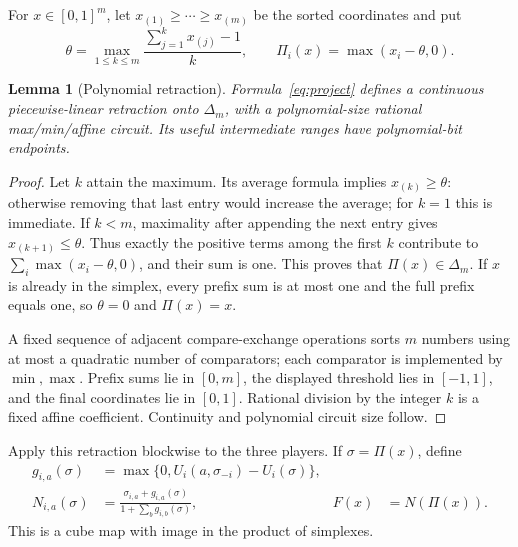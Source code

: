 \documentclass[11pt,a4paper]{article}
\numberwithin{equation}{section}
\newtheorem{lemma}[theorem]{Lemma}
\theoremstyle{definition}
\begin{document}
For \(x\in[0,1]^m\), let \(x_{(1)}\geq\cdots\geq x_{(m)}\)
be the sorted coordinates and put
\begin{equation}\label{eq:project}
 \theta=\max_{1\leq k\leq m}
           \frac{\sum_{j=1}^k x_{(j)}-1}{k},
 \qquad \Pi_i(x)=\max(x_i-\theta,0).
\end{equation}

\begin{lemma}[Polynomial retraction]\label{lem:projection}
Formula~\eqref{eq:project} defines a continuous piecewise-linear
retraction onto \(\Delta_m\), with a polynomial-size rational
max/min/affine circuit. Its useful intermediate ranges have
polynomial-bit endpoints.
\end{lemma}
\begin{proof}
Let \(k\) attain the maximum. Its average formula implies
\(x_{(k)}\geq\theta\): otherwise removing that last entry would
increase the average; for \(k=1\) this is immediate.
If \(k<m\), maximality after appending the next entry gives
\(x_{(k+1)}\leq\theta\). Thus exactly the positive terms among the
first \(k\) contribute to \(\sum_i\max(x_i-\theta,0)\), and their
sum is one. This proves that \(\Pi(x)\in\Delta_m\).
If \(x\) is already in the simplex, every prefix sum is at most one
and the full prefix equals one, so \(\theta=0\) and \(\Pi(x)=x\).

A fixed sequence of adjacent compare-exchange operations sorts \(m\)
numbers using at most a quadratic number of comparators; each comparator
is implemented by \(\min,\max\). Prefix sums lie in \([0,m]\), the
displayed threshold lies in \([-1,1]\), and the final coordinates lie
in \([0,1]\). Rational division by the integer \(k\) is a fixed
affine coefficient. Continuity and polynomial circuit size follow.
\end{proof}

Apply this retraction blockwise to the three players. If
\(\sigma=\Pi(x)\), define
\begin{align}
 g_{i,a}(\sigma)
   &=\max\{0,U_i(a,\sigma_{-i})-U_i(\sigma)\},\label{eq:gain}\\
 N_{i,a}(\sigma)
   &=\frac{\sigma_{i,a}+g_{i,a}(\sigma)}
            {1+\sum_b g_{i,b}(\sigma)},
 &F(x)&=N(\Pi(x)).\label{eq:nashmap}
\end{align}
This is a cube map with image in the product of simplexes.
\end{document}
